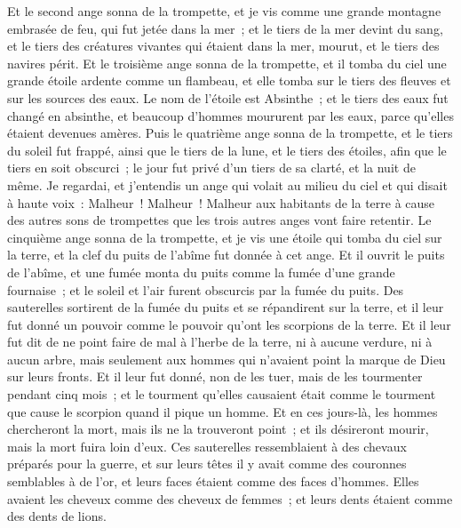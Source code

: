 \begin{multicols}{2}
Et le second ange sonna de la trompette, et je vis comme une grande montagne embrasée de feu, qui fut jetée dans la mer~; et le tiers de la mer devint du sang,
et le tiers des créatures vivantes qui étaient dans la mer, mourut, et le tiers des navires périt.
Et le troisième ange sonna de la trompette, et il tomba du ciel une grande étoile ardente comme un flambeau, et elle tomba sur le tiers des fleuves et sur les sources des eaux.
Le nom de l'étoile est Absinthe~; et le tiers des eaux fut changé en absinthe, et beaucoup d'hommes moururent par les eaux, parce qu'elles étaient devenues amères.
Puis le quatrième ange sonna de la trompette, et le tiers du soleil fut frappé, ainsi que le tiers de la lune, et le tiers des étoiles, afin que le tiers en soit obscurci~; le jour fut privé d'un tiers de sa clarté, et la nuit de même.
Je regardai, et j'entendis un ange qui volait au milieu du ciel et qui disait à haute voix~: Malheur~! Malheur~! Malheur aux habitants de la terre à cause des autres sons de trompettes que les trois autres anges vont faire retentir.
\VerseOne{}Le cinquième ange sonna de la trompette, et je vis une étoile qui tomba du ciel sur la terre, et la clef du puits de l'abîme fut donnée à cet ange.
Et il ouvrit le puits de l'abîme, et une fumée monta du puits comme la fumée d'une grande fournaise~; et le soleil et l'air furent obscurcis par la fumée du puits.
Des sauterelles sortirent de la fumée du puits et se répandirent sur la terre, et il leur fut donné un pouvoir comme le pouvoir qu'ont les scorpions de la terre.
Et il leur fut dit de ne point faire de mal à l'herbe de la terre, ni à aucune verdure, ni à aucun arbre, mais seulement aux hommes qui n'avaient point la marque de Dieu sur leurs fronts.
Et il leur fut donné, non de les tuer, mais de les tourmenter pendant cinq mois~; et le tourment qu'elles causaient était comme le tourment que cause le scorpion quand il pique un homme.
Et en ces jours-là, les hommes chercheront la mort, mais ils ne la trouveront point~; et ils désireront mourir, mais la mort fuira loin d'eux.
Ces sauterelles ressemblaient à des chevaux préparés pour la guerre, et sur leurs têtes il y avait comme des couronnes semblables à de l'or, et leurs faces étaient comme des faces d'hommes.
Elles avaient les cheveux comme des cheveux de femmes~; et leurs dents étaient comme des dents de lions.

\end{multicols}

